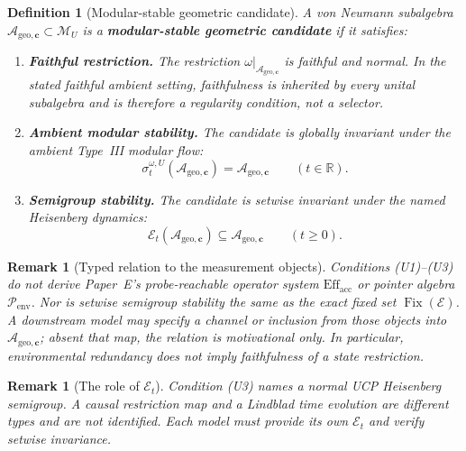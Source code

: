 \documentclass[12pt,a4paper,openany]{book}
\newtheorem{definition}[theorem]{Definition}
\newtheorem{remark}[theorem]{Remark}
\begin{document}
\begin{definition}[Modular-stable geometric candidate]
\label{D-def:modular-accessible}
A von Neumann subalgebra $\mathcal{A}_{\mathrm{geo},\mathbf{c}}\subset\mathcal M_U$ is a \textbf{modular-stable geometric candidate} if it satisfies:

\begin{enumerate}
\item[\textup{(U1)}] \textbf{Faithful restriction.} The restriction $\omega|_{\mathcal{A}_{\mathrm{geo},\mathbf{c}}}$ is faithful and normal.  In the stated faithful ambient setting, faithfulness is inherited by every unital subalgebra and is therefore a regularity condition, not a selector.

\item[\textup{(U2)}] \textbf{Ambient modular stability.} The candidate is globally invariant under the ambient Type~III modular flow:
\begin{equation}
\sigma_t^{\omega,U}(\mathcal{A}_{\mathrm{geo},\mathbf{c}})
=\mathcal{A}_{\mathrm{geo},\mathbf{c}}
\qquad(t\in\mathbb R).
\end{equation}

\item[\textup{(U3)}] \textbf{Semigroup stability.} The candidate is setwise invariant under the named Heisenberg dynamics:
\begin{equation}
\mathcal E_t(\mathcal{A}_{\mathrm{geo},\mathbf{c}})
\subseteq\mathcal{A}_{\mathrm{geo},\mathbf{c}}
\qquad(t\ge0).
\end{equation}
\end{enumerate}
\end{definition}

\begin{remark}[Typed relation to the measurement objects]
\label{D-rem:translation}
Conditions (U1)--(U3) do not derive Paper~E's probe-reachable operator system $\mathrm{Eff}_{\mathrm{acc}}$ or pointer algebra $\mathcal P_{\mathrm{env}}$.  Nor is setwise semigroup stability the same as the exact fixed set $\operatorname{Fix}(\mathcal E)$.  A downstream model may specify a channel or inclusion from those objects into $\mathcal{A}_{\mathrm{geo},\mathbf{c}}$; absent that map, the relation is motivational only.  In particular, environmental redundancy does not imply faithfulness of a state restriction.
\end{remark}

\begin{remark}[The role of $\mathcal{E}_t$]
Condition (U3) names a normal UCP Heisenberg semigroup.  A causal restriction map and a Lindblad time evolution are different types and are not identified.  Each model must provide its own $\mathcal E_t$ and verify setwise invariance.
\end{remark}
\end{document}
